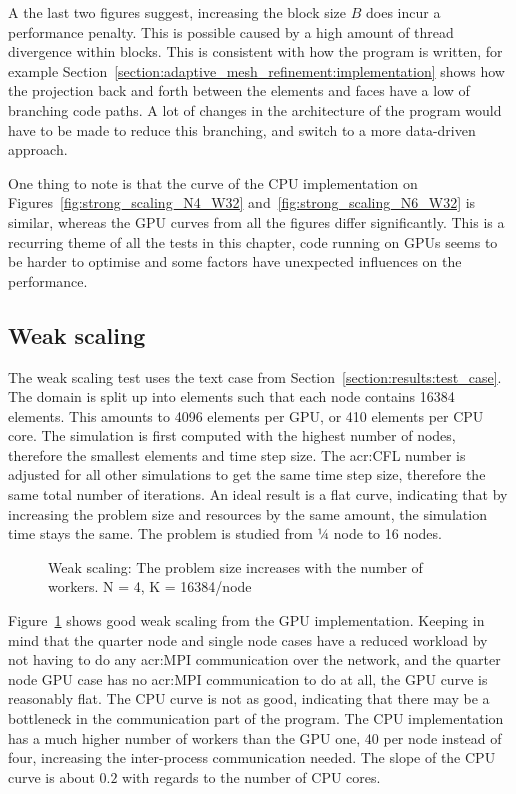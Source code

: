 A the last two figures suggest, increasing the block size $B$ does incur a performance penalty. This
is possible caused by a high amount of thread divergence within blocks. This is consistent with how
the program is written, for example Section~\ref{section:adaptive_mesh_refinement:implementation}
shows how the projection back and forth between the elements and faces have a low of branching code
paths. A lot of changes in the architecture of the program would have to be made to reduce this
branching, and switch to a more data-driven approach.

One thing to note is that the curve of the CPU implementation on
Figures~\ref{fig:strong_scaling_N4_W32} and~\ref{fig:strong_scaling_N6_W32} is similar, whereas the
GPU curves from all the figures differ significantly. This is a recurring theme of all the tests in
this chapter, code running on GPUs seems to be harder to optimise and some factors have unexpected
influences on the performance.

\subsection{Weak scaling} \label{subsection:results:scaling_tests:weak}

The weak scaling test uses the text case from Section~\ref{section:results:test_case}. The domain is
split up into elements such that each node contains 16384 elements. This amounts to 4096 elements
per GPU, or 410 elements per CPU core. The simulation is first computed with the highest number of
nodes, therefore the smallest elements and time step size. The \acrshort{acr:CFL} number is adjusted for all other
simulations to get the same time step size, therefore the same total number of iterations. An ideal
result is a flat curve, indicating that by increasing the problem size and resources by the same
amount, the simulation time stays the same. The problem is studied from ¼ node to 16 nodes.

\begin{figure}[H]
	\centering
	
	\caption{Weak scaling: The problem size increases with the number of workers. N = 4, K = 16384/node}
	\label{fig:weak_scaling}
\end{figure}

Figure~\ref{fig:weak_scaling} shows good weak scaling from the GPU implementation. Keeping in mind
that the quarter node and single node cases have a reduced workload by not having to do any
\acrshort{acr:MPI} communication over the network, and the quarter node GPU case has no
\acrshort{acr:MPI} communication to do at all, the GPU curve is reasonably flat. The CPU curve is
not as good, indicating that there may be a bottleneck in the communication part of the program. The
CPU implementation has a much higher number of workers than the GPU one, 40 per node instead of
four, increasing the inter-process communication needed. The slope of the CPU curve is about $0.2$
with regards to the number of CPU cores. 


